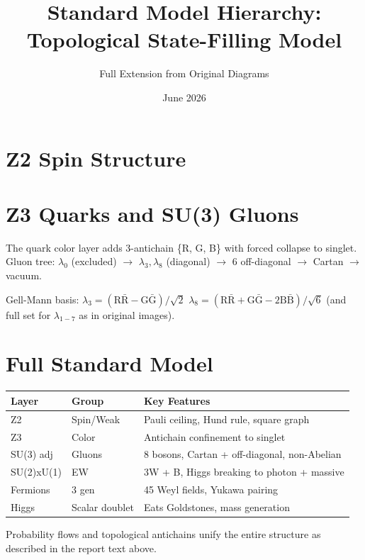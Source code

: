 \documentclass{article}
\title{Standard Model Hierarchy: Topological State-Filling Model}
\author{Full Extension from Original Diagrams}
\date{June 2026}
\begin{document}
\maketitle

\section{Z2 Spin Structure}

\section{Z3 Quarks and SU(3) Gluons}
The quark color layer adds 3-antichain \{R, G, B\} with forced collapse to singlet. Gluon tree: $\lambda_0$ (excluded) $\to$ $\lambda_3,\lambda_8$ (diagonal) $\to$ 6 off-diagonal $\to$ Cartan $\to$ vacuum.

Gell-Mann basis:
$\lambda_3 = (\mathrm{R}\bar{\mathrm{R}} - \mathrm{G}\bar{\mathrm{G}})/\sqrt{2}$
$\lambda_8 = (\mathrm{R}\bar{\mathrm{R}} + \mathrm{G}\bar{\mathrm{G}} - 2\mathrm{B}\bar{\mathrm{B}})/\sqrt{6}$
(and full set for $\lambda_{1-7}$ as in original images).

\section{Full Standard Model}
\begin{longtable}{l l l}
\toprule
Layer & Group & Key Features \\
\midrule
Z2 & Spin/Weak & Pauli ceiling, Hund rule, square graph \\
Z3 & Color & Antichain confinement to singlet \\
SU(3) adj & Gluons & 8 bosons, Cartan + off-diagonal, non-Abelian \\
SU(2)xU(1) & EW & 3W + B, Higgs breaking to photon + massive \\
Fermions & 3 gen & 45 Weyl fields, Yukawa pairing \\
Higgs & Scalar doublet & Eats Goldstones, mass generation \\
\bottomrule
\end{longtable}

Probability flows and topological antichains unify the entire structure as described in the report text above.
\end{document}
